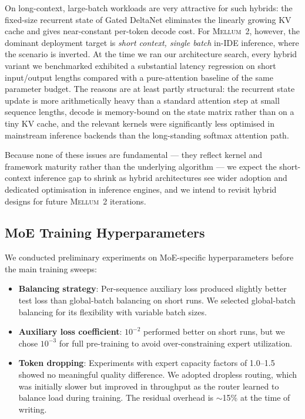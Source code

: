 \documentclass[11pt,a4paper]{article}
\newcommand{\modelname}{\textsc{Mellum~2}\xspace}
\begin{document}
On long-context, large-batch workloads are very attractive for such hybrids: the
fixed-size recurrent state of Gated DeltaNet eliminates the linearly growing
KV cache and gives near-constant per-token decode cost. For \modelname{},
however, the dominant deployment target is \emph{short context, single batch}
in-IDE inference, where the scenario is inverted. At the time we ran our
architecture search, every hybrid variant we benchmarked exhibited a substantial latency regression on short
input/output lengths compared with a pure-attention baseline of the same
parameter budget. The reasons are at least partly structural: the recurrent
state update is more arithmetically heavy than a standard attention step at
small sequence lengths, decode is memory-bound on the state matrix rather
than on a tiny KV cache, and the relevant kernels were significantly less
optimised in mainstream inference backends than the long-standing softmax
attention path.

Because none of these issues are fundamental --- they reflect kernel and
framework maturity rather than the underlying algorithm --- we expect the
short-context inference gap to shrink as hybrid architectures see wider
adoption and dedicated optimisation in inference engines, and we intend to
revisit hybrid designs for future \modelname{} iterations.

\subsection{MoE Training Hyperparameters}
\label{app:moe-training}

We conducted preliminary experiments on MoE-specific hyperparameters before
the main training sweeps:

\begin{itemize}
  \item \textbf{Balancing strategy}: Per-sequence auxiliary loss produced
    slightly better test loss than global-batch balancing on short runs.
    We selected global-batch balancing for its flexibility with variable
    batch sizes.
  \item \textbf{Auxiliary loss coefficient}: $10^{-2}$ performed better on
    short runs, but we chose $10^{-3}$ for full pre-training to avoid
    over-constraining expert utilization.
  \item \textbf{Token dropping}: Experiments with expert capacity factors of
    1.0--1.5 showed no meaningful quality difference. We adopted dropless
    routing, which was initially slower but improved in throughput as the
    router learned to balance load during training. The residual overhead
    is ${\sim}$15\% at the time of writing.
\end{itemize}
\end{document}
